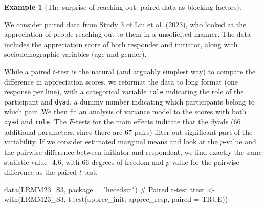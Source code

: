 \documentclass[
  11pt,
  letterpaper,
]{scrbook}
\newenvironment{Shaded}{\begin{snugshade}}{\end{snugshade}}
\newcommand{\AttributeTok}[1]{\textcolor[rgb]{0.40,0.45,0.13}{#1}}
\newcommand{\CommentTok}[1]{\textcolor[rgb]{0.37,0.37,0.37}{#1}}
\newcommand{\ConstantTok}[1]{\textcolor[rgb]{0.56,0.35,0.01}{#1}}
\newcommand{\FunctionTok}[1]{\textcolor[rgb]{0.28,0.35,0.67}{#1}}
\newcommand{\NormalTok}[1]{\textcolor[rgb]{0.00,0.23,0.31}{#1}}
\newcommand{\OtherTok}[1]{\textcolor[rgb]{0.00,0.23,0.31}{#1}}
\newcommand{\StringTok}[1]{\textcolor[rgb]{0.13,0.47,0.30}{#1}}
\theoremstyle{definition}
\theoremstyle{definition}
\newtheorem{example}{Example}[chapter]
\theoremstyle{remark}
\begin{document}
\begin{example}[The surprise of reaching out: paired data as blocking
factors]\protect\hypertarget{exm-reachingout}{}\label{exm-reachingout}

We consider paired data from Study 3 of Liu et al. (2023), who looked at
the appreciation of people reaching out to them in a unsolicited manner.
The data includes the appreciation score of both responder and
initiator, along with sociodemographic variables (age and gender).

While a paired \(t\)-test is the natural (and arguably simplest way) to
compare the difference in appreciation scores, we reformat the data to
long format (one response per line), with a categorical variable
\texttt{role} indicating the role of the participant and \texttt{dyad},
a dummy number indicating which participants belong to which pair. We
then fit an analysis of variance model to the scores with both
\texttt{dyad} and \texttt{role}. The \(F\)-tests for the main effects
indicate that the dyads (66 additional parameters, since there are 67
pairs) filter out significant part of the variability. If we consider
estimated marginal means and look at the \(p\)-value and the pairwise
difference between initiator and respondent, we find exactly the same
statistic value -4.6, with \(66\) degrees of freedom and \(p\)-value for
the pairwise difference as the paired \(t\)-test.

\begin{Shaded}
\begin{Highlighting}[]
\FunctionTok{data}\NormalTok{(LRMM23\_S3, }\AttributeTok{package =} \StringTok{"hecedsm"}\NormalTok{)}
\CommentTok{\# Paired t{-}test}
\NormalTok{ttest }\OtherTok{\textless{}{-}} \FunctionTok{with}\NormalTok{(LRMM23\_S3, }\FunctionTok{t.test}\NormalTok{(apprec\_init, apprec\_resp, }\AttributeTok{paired =} \ConstantTok{TRUE}\NormalTok{))}
\end{Highlighting}
\end{Shaded}


\end{example}
\end{document}
